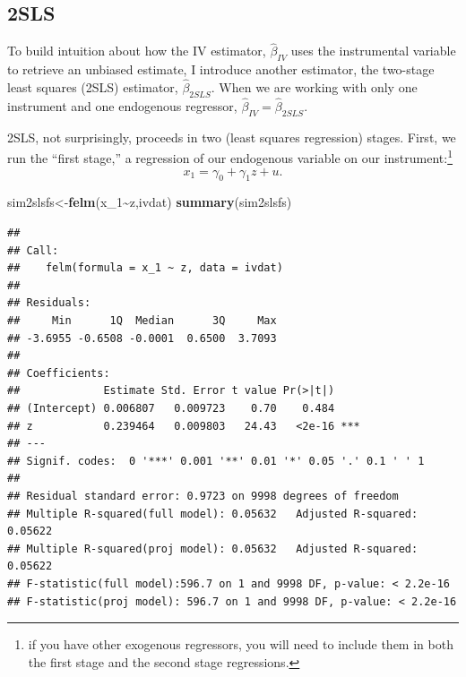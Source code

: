 \documentclass[
]{article}
\newenvironment{Shaded}{\begin{snugshade}}{\end{snugshade}}
\newcommand{\DecValTok}[1]{\textcolor[rgb]{0.00,0.00,0.81}{#1}}
\newcommand{\KeywordTok}[1]{\textcolor[rgb]{0.13,0.29,0.53}{\textbf{#1}}}
\newcommand{\NormalTok}[1]{#1}
\newcommand{\OperatorTok}[1]{\textcolor[rgb]{0.81,0.36,0.00}{\textbf{#1}}}
\begin{document}
\subsection{2SLS}

To build intuition about how the IV estimator, \(\hat{\beta}_{IV}\) uses
the instrumental variable to retrieve an unbiased estimate, I introduce
another estimator, the two-stage least squares (2SLS) estimator,
\(\hat{\beta}_{2SLS}\). When we are working with only one instrument and
one endogenous regressor, \(\hat{\beta}_{IV}=\hat{\beta}_{2SLS}\).

2SLS, not surprisingly, proceeds in two (least squares regression)
stages. First, we run the ``first stage,'' a regression of our
endogenous variable on our instrument:\footnote{if you have other
  exogenous regressors, you will need to include them in both the first
  stage and the second stage regressions.} \[
x_1=\gamma_0+\gamma_1z+u.
\]

\begin{Shaded}
\begin{Highlighting}[]
\NormalTok{sim2slsfs\textless{}{-}}\KeywordTok{felm}\NormalTok{(x\_}\DecValTok{1}\OperatorTok{\textasciitilde{}}\NormalTok{z,ivdat)}
\KeywordTok{summary}\NormalTok{(sim2slsfs)}
\end{Highlighting}
\end{Shaded}

\begin{verbatim}
## 
## Call:
##    felm(formula = x_1 ~ z, data = ivdat) 
## 
## Residuals:
##     Min      1Q  Median      3Q     Max 
## -3.6955 -0.6508 -0.0001  0.6500  3.7093 
## 
## Coefficients:
##             Estimate Std. Error t value Pr(>|t|)    
## (Intercept) 0.006807   0.009723    0.70    0.484    
## z           0.239464   0.009803   24.43   <2e-16 ***
## ---
## Signif. codes:  0 '***' 0.001 '**' 0.01 '*' 0.05 '.' 0.1 ' ' 1
## 
## Residual standard error: 0.9723 on 9998 degrees of freedom
## Multiple R-squared(full model): 0.05632   Adjusted R-squared: 0.05622 
## Multiple R-squared(proj model): 0.05632   Adjusted R-squared: 0.05622 
## F-statistic(full model):596.7 on 1 and 9998 DF, p-value: < 2.2e-16 
## F-statistic(proj model): 596.7 on 1 and 9998 DF, p-value: < 2.2e-16
\end{verbatim}

\begin{Shaded}
\end{Shaded}
\end{document}
